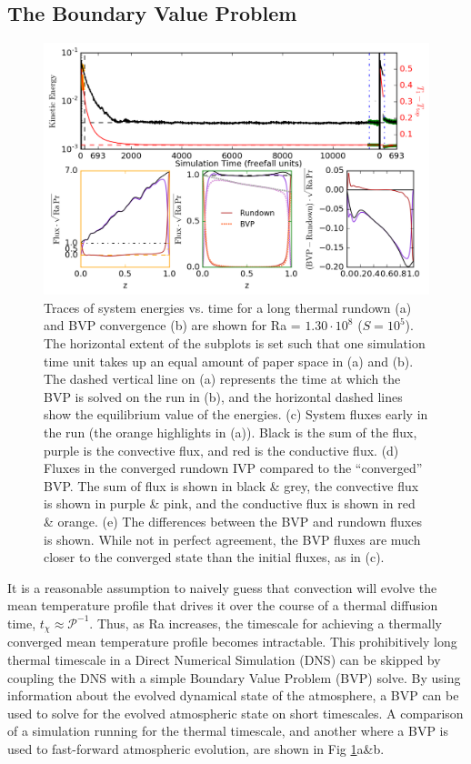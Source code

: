 \documentclass[aps, pre, onecolumn, nofootinbib, notitlepage, groupedaddress, amsfonts, amssymb, amsmath, longbibliography]{revtex4-1}
\begin{document}
\subsection{The Boundary Value Problem}
\begin{figure}[t]
\includegraphics[width=\textwidth]{./figs/time_trace.png}
\caption{Traces of system energies vs. time for a long thermal rundown (a) and BVP convergence
(b) are shown for Ra = $1.30 \cdot 10^8$ ($S = 10^5$).  The horizontal extent of the subplots is set
such that one simulation time unit takes up an equal amount of paper space in (a) and (b).
The dashed vertical line on (a) represents the time at which the BVP is solved on the run in (b),
and the horizontal dashed lines show the equilibrium value of the energies.
(c) System fluxes early in the run (the orange highlights in (a)).  Black is the sum of the flux, purple
is the convective flux, and red is the conductive flux.
(d) Fluxes in the converged rundown IVP compared to the ``converged'' BVP.  The sum of flux is shown in
black \& grey, the convective flux is shown in purple \& pink, and the conductive flux is shown in red \& orange.
(e) The differences between the BVP and rundown fluxes is shown.  While not in perfect agreement, the BVP fluxes
are much closer to the converged state than the initial fluxes, as in (c).
\label{fig:time_trace} }
\end{figure}

It is a reasonable assumption to naively guess that convection will evolve the mean temperature profile that
drives it over the course of a thermal diffusion time, $t_\chi \approx \mathcal{P}^{-1}$. Thus, as Ra
increases, the timescale for achieving a thermally converged mean temperature profile becomes intractable.
This prohibitively long thermal timescale in a Direct Numerical Simulation (DNS) 
can be skipped by coupling the DNS with a simple Boundary Value Problem
(BVP) solve. By using information about the evolved dynamical state of the atmosphere,
a BVP can be used to solve for the evolved atmospheric state on short timescales.
A comparison of a simulation running for the thermal timescale, and another where a BVP is used
to fast-forward atmospheric evolution, are shown in Fig \ref{fig:time_trace}a\&b.
\end{document}
